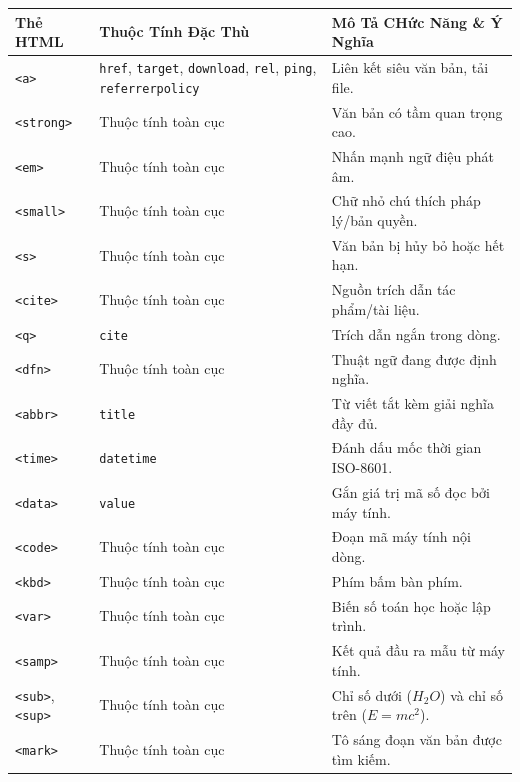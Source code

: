 \documentclass[11pt,oneside]{book}
\newcommand{\codeinline}[1]{\textcolor{accentOrange}{\texttt{#1}}}
\begin{document}
\begin{table}[H]
\centering
\begin{prettyTableBox}
\small
{}
\begin{tabularx}{\linewidth}{lp{3.5cm}X}
\rowcolor{primaryBlue}
\color{white}\textbf{Thẻ HTML} & \color{white}\textbf{Thuộc Tính Đặc Thù} & \color{white}\textbf{Mô Tả CHức Năng \& Ý Nghĩa} \\
\hline
\codeinline{<a>} & \codeinline{href}, \codeinline{target}, \codeinline{download}, \codeinline{rel}, \codeinline{ping}, \codeinline{referrerpolicy} & Liên kết siêu văn bản, tải file. \\
\codeinline{<strong>} & Thuộc tính toàn cục & Văn bản có tầm quan trọng cao. \\
\codeinline{<em>} & Thuộc tính toàn cục & Nhấn mạnh ngữ điệu phát âm. \\
\codeinline{<small>} & Thuộc tính toàn cục & Chữ nhỏ chú thích pháp lý/bản quyền. \\
\codeinline{<s>} & Thuộc tính toàn cục & Văn bản bị hủy bỏ hoặc hết hạn. \\
\codeinline{<cite>} & Thuộc tính toàn cục & Nguồn trích dẫn tác phẩm/tài liệu. \\
\codeinline{<q>} & \codeinline{cite} & Trích dẫn ngắn trong dòng. \\
\codeinline{<dfn>} & Thuộc tính toàn cục & Thuật ngữ đang được định nghĩa. \\
\codeinline{<abbr>} & \codeinline{title} & Từ viết tắt kèm giải nghĩa đầy đủ. \\
\codeinline{<time>} & \codeinline{datetime} & Đánh dấu mốc thời gian ISO-8601. \\
\codeinline{<data>} & \codeinline{value} & Gắn giá trị mã số đọc bởi máy tính. \\
\codeinline{<code>} & Thuộc tính toàn cục & Đoạn mã máy tính nội dòng. \\
\codeinline{<kbd>} & Thuộc tính toàn cục & Phím bấm bàn phím. \\
\codeinline{<var>} & Thuộc tính toàn cục & Biến số toán học hoặc lập trình. \\
\codeinline{<samp>} & Thuộc tính toàn cục & Kết quả đầu ra mẫu từ máy tính. \\
\codeinline{<sub>}, \codeinline{<sup>} & Thuộc tính toàn cục & Chỉ số dưới ($H_2O$) và chỉ số trên ($E=mc^2$). \\
\codeinline{<mark>} & Thuộc tính toàn cục & Tô sáng đoạn văn bản được tìm kiếm. \\

\end{tabularx}
\end{prettyTableBox}
\end{table}
\end{document}
